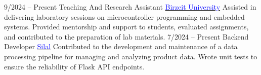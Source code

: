 \documentclass[9pt]{developercv} %
\begin{document}
\begin{entrylist}

    \entry
    {9/2024 -- Present}
    {Teaching And Research Assistant}
    {\href{https://www.birzeit.edu/en}{\textcolor{blue}{Birzeit University}}}
    {
        Assisted in delivering laboratory sessions on microcontroller programming and embedded systems. Provided mentorship and support to students, evaluated assignments, and contributed to the preparation of lab materials.
    }
    \entry
        {7/2024 -- Present}
        {Backend Developer}
        {{\href{https://www.silal.app/en}{\textcolor{blue}{Silal}}}}
        { Contributed to the development and maintenance of a data processing pipeline for managing and analyzing product data. Wrote unit tests to ensure the reliability of Flask API endpoints.}
    

\end{entrylist}
\end{document}
